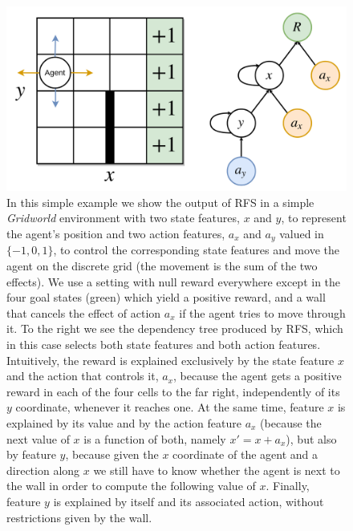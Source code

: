 \begin{figure}
\includegraphics[width=\textwidth]{pictures/rfs_grid}
\centering
\caption[RFS on \textit{Gridworld}]{In this simple example we show the output
				    of RFS in a simple \textit{Gridworld} 
				    environment with two state features, $x$
				    and $y$, to represent the agent's position 
				    and two action features, $a_x$
				    and $a_y$ valued in $\{-1, 0, 1\}$, to 
				    control the corresponding state features and
				    move the agent on the discrete grid (the 
				    movement is the sum of the two effects). We 
				    use a setting with null reward everywhere
				    except in the four goal states (green) which
				    yield a positive reward, and a wall that cancels 
				    the effect of action $a_x$ if the agent 
				    tries to move through it.
				    To the right we see the dependency tree 
				    produced by RFS, which in this case selects
				    both state features and both action features.
				    Intuitively, the reward is explained 
				    exclusively by the state feature $x$ and the
				    action that controls it, $a_x$, because the 
				    agent gets a positive reward in each of the 
				    four cells to the far right, independently
				    of its $y$ coordinate, whenever it reaches 
				    one. At the same time, 
				    feature $x$ is explained by its value and
				    by the action feature $a_x$ (because
				    the next value of $x$ is a function of both,
				    namely $x' = x + a_x$), but also by feature 
				    $y$, because given the $x$ coordinate of the 
				    agent and a direction along $x$ we still 
				    have to know whether the agent is next to 
				    the wall in order to compute the following 
				    value of $x$. Finally, feature $y$ is 
				    explained by itself and its associated 
				    action, without restrictions given by 
				    the wall.}
\label{f:rfs_grid}
\end{figure}
%

